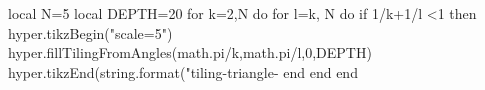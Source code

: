 \documentclass[margin=.2cm,multi,tikz]{standalone}
\begin{document}
\begin{luacode*}
local N=5
local DEPTH=20
for k=2,N do
	for l=k, N do
		if 1/k+1/l <1 then
			hyper.tikzBegin("scale=5")
			hyper.fillTilingFromAngles(math.pi/k,math.pi/l,0,DEPTH)
			hyper.tikzEnd(string.format("tiling-triangle-%
		end
	end
end 
\end{luacode*}
\end{document}
